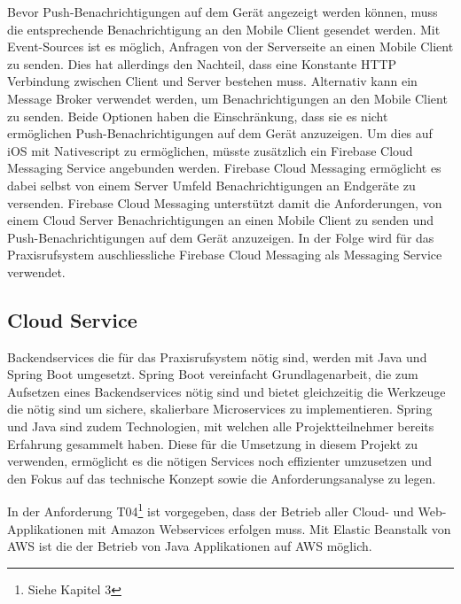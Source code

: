 Bevor Push-Benachrichtigungen auf dem Gerät angezeigt werden können, muss die entsprechende Benachrichtigung an den Mobile Client gesendet werden. 
Mit Event-Sources\cite{event-source} ist es möglich, Anfragen von der Serverseite an einen Mobile Client zu senden.
Dies hat allerdings den Nachteil, dass eine Konstante HTTP Verbindung zwischen Client und Server bestehen muss.
Alternativ kann ein Message Broker verwendet werden, um Benachrichtigungen an den Mobile Client zu senden.\cite{broker}
Beide Optionen haben die Einschränkung, dass sie es nicht ermöglichen Push-Benachrichtigungen auf dem Gerät anzuzeigen.
Um dies auf iOS mit Nativescript zu ermöglichen, müsste zusätzlich ein Firebase Cloud Messaging Service angebunden werden.
Firebase Cloud Messaging ermöglicht es dabei selbst von einem Server Umfeld Benachrichtigungen an Endgeräte zu versenden.\cite{fcm-java}
Firebase Cloud Messaging unterstützt damit die Anforderungen, von einem Cloud Server Benachrichtigungen an einen Mobile Client zu senden und Push-Benachrichtigungen auf dem Gerät anzuzeigen.
In der Folge wird für das Praxisrufsystem auschliessliche Firebase Cloud Messaging als Messaging Service verwendet.

\subsection{Cloud Service}\label{subsec:cloud-service2}

Backendservices die für das Praxisrufsystem nötig sind, werden mit Java und Spring Boot umgesetzt.
Spring Boot vereinfacht Grundlagenarbeit, die zum Aufsetzen eines Backendservices nötig sind und bietet
gleichzeitig die Werkzeuge die nötig sind um sichere, skalierbare Microservices zu implementieren.\cite{why-spring}
Spring und Java sind zudem Technologien, mit welchen alle Projektteilnehmer bereits Erfahrung gesammelt haben.
Diese für die Umsetzung in diesem Projekt zu verwenden, ermöglicht es die nötigen Services noch effizienter umzusetzen
und den Fokus auf das technische Konzept sowie die Anforderungsanalyse zu legen.

In der Anforderung T04\footnote{Siehe Kapitel 3} ist vorgegeben, dass der Betrieb aller Cloud- und Web-Applikationen mit Amazon Webservices erfolgen muss.
Mit Elastic Beanstalk von AWS ist die der Betrieb von Java Applikationen auf AWS möglich.\cite{aws-spring-java}


